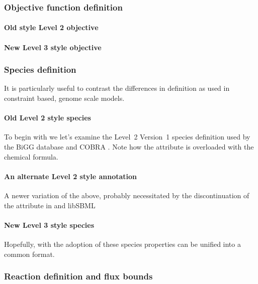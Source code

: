 \subsubsection*{Objective function definition}
\paragraph{Old style \SBML Level 2 objective}
\newpage
\paragraph{New \SBML Level 3 style objective}
\protect{}


\subsubsection*{Species definition}
It is particularly useful to contrast the differences in \Species definition as used in constraint based, genome scale models.

\paragraph{Old \SBML Level 2 style species}
To begin with we let's examine the \SBML Level~2 Version~1 species definition used by the BiGG database and \textsf{COBRA} \cite{bigg, cobra}. Note how the  attribute is overloaded with the chemical formula.
%

\paragraph{An alternate \SBML Level 2 style annotation}
A newer variation of the above, probably necessitated by the discontinuation of the  attribute in \SBML and \textsf{libSBML}
%

\paragraph{New \SBML Level 3 style species}
Hopefully, with the adoption of \SBML \FBC these species properties can be unified into a common format.
%




\subsubsection*{Reaction definition and flux bounds}

